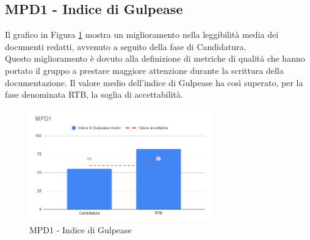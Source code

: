 \newpage
\subsection{MPD1 - Indice di Gulpease}
\label{s:mpd1}
Il grafico in Figura \ref{fig:mpd1} mostra un miglioramento nella leggibilità media dei documenti redatti, avvenuto a seguito della fase di Candidatura.\\
Questo miglioramento è dovuto alla definizione di metriche di qualità che hanno portato il gruppo a prestare maggiore attenzione durante la scrittura della documentazione.
Il valore medio dell'indice di Gulpease ha così superato, per la fase denominata RTB, la soglia di accettabilità.

\begin{figure}[htbp]
    \centering
    \includegraphics[width=0.7\textwidth]{img/MPD1.png}
    \caption{MPD1 - Indice di Gulpease}
    \label{fig:mpd1}
\end{figure}